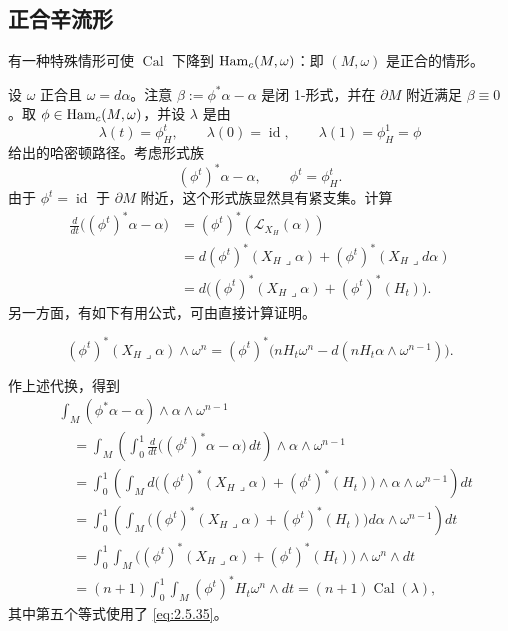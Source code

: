 \subsection{正合辛流形}

有一种特殊情形可使 $\operatorname{Cal}$ 下降到 $\operatorname{Ham}_c(M,\omega)$：即 $(M,\omega)$ 是正合的情形。

设 $\omega$ 正合且 $\omega=d\alpha$。注意
$\beta:=\phi^*\alpha-\alpha$ 是闭 1-形式，并在 $\partial M$ 附近满足 $\beta\equiv0$。取
$\phi\in\operatorname{Ham}_c(M,\omega)$，并设 $\lambda$ 是由
\[
  \lambda(t)=\phi_H^t,
  \qquad \lambda(0)=\operatorname{id},
  \qquad \lambda(1)=\phi_H^1=\phi
\]
给出的哈密顿路径。考虑形式族
\[
  (\phi^t)^*\alpha-\alpha,
  \qquad \phi^t=\phi_H^t.
\]
由于 $\phi^t=\operatorname{id}$ 于 $\partial M$ 附近，这个形式族显然具有紧支集。计算
\[
\begin{aligned}
 \frac d{dt}\bigl((\phi^t)^*\alpha-\alpha\bigr)
 &=(\phi^t)^*(\mathcal L_{X_H}(\alpha))\\
 &=d(\phi^t)^*(X_H\mathbin{\lrcorner}\alpha)
   +(\phi^t)^*(X_H\mathbin{\lrcorner}d\alpha)\\
 &=d\bigl((\phi^t)^*(X_H\mathbin{\lrcorner}\alpha)
   +(\phi^t)^*(H_t)\bigr).
\end{aligned}
\]
另一方面，有如下有用公式，可由直接计算证明。

\begin{lemma}
\label{lem:calabi-exact-identity}
\begin{equation}
 (\phi^t)^*(X_H\mathbin{\lrcorner}\alpha)\wedge\omega^n
 =(\phi^t)^*\bigl(nH_t\omega^n-d(nH_t\alpha\wedge\omega^{n-1})\bigr).
 \label{eq:2.5.35}
\end{equation}
\end{lemma}

作上述代换，得到
\[
\begin{aligned}
 &\int_M(\phi^*\alpha-\alpha)\wedge\alpha\wedge\omega^{n-1}\\
 &\quad=\int_M\left(\int_0^1\frac d{dt}
   \bigl((\phi^t)^*\alpha-\alpha\bigr)\,dt\right)
   \wedge\alpha\wedge\omega^{n-1}\\
 &\quad=\int_0^1\left(\int_M
   d\bigl((\phi^t)^*(X_H\mathbin{\lrcorner}\alpha)
   +(\phi^t)^*(H_t)\bigr)\wedge\alpha\wedge\omega^{n-1}\right)dt\\
 &\quad=\int_0^1\left(\int_M
   \bigl((\phi^t)^*(X_H\mathbin{\lrcorner}\alpha)
   +(\phi^t)^*(H_t)\bigr)d\alpha\wedge\omega^{n-1}\right)dt\\
 &\quad=\int_0^1\int_M
   \bigl((\phi^t)^*(X_H\mathbin{\lrcorner}\alpha)
   +(\phi^t)^*(H_t)\bigr)\wedge\omega^n\wedge dt\\
 &\quad=(n+1)\int_0^1\int_M(\phi^t)^*H_t\omega^n\wedge dt
   =(n+1)\operatorname{Cal}(\lambda),
\end{aligned}
\]
其中第五个等式使用了 \eqref{eq:2.5.35}。

